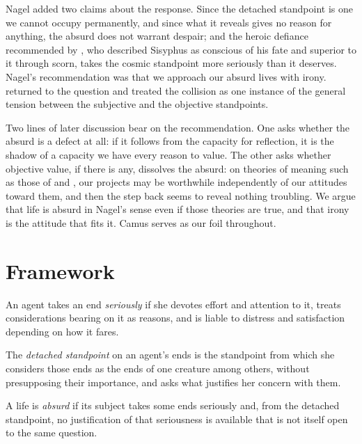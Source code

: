 \documentclass{situationist-preprint}
\begin{document}
Nagel added two claims about the response. Since the detached standpoint is one we cannot occupy permanently, and since what it reveals gives no reason for anything, the absurd does not warrant despair; and the heroic defiance recommended by \citet{Camus1942}, who described Sisyphus as conscious of his fate and superior to it through scorn, takes the cosmic standpoint more seriously than it deserves. Nagel's recommendation was that we approach our absurd lives with irony. \citet[ch.~XI]{Nagel1986} returned to the question and treated the collision as one instance of the general tension between the subjective and the objective standpoints.

Two lines of later discussion bear on the recommendation. One asks whether the absurd is a defect at all: if it follows from the capacity for reflection, it is the shadow of a capacity we have every reason to value. The other asks whether objective value, if there is any, dissolves the absurd: on theories of meaning such as those of \citet{Wolf2010} and \citet{Metz2013}, our projects may be worthwhile independently of our attitudes toward them, and then the step back seems to reveal nothing troubling. We argue that life is absurd in Nagel's sense even if those theories are true, and that irony is the attitude that fits it. Camus serves as our foil throughout.

\section{Framework}

\begin{definition}[Seriousness]\label{d:serious}
An agent takes an end \emph{seriously} if she devotes effort and attention to it, treats considerations bearing on it as reasons, and is liable to distress and satisfaction depending on how it fares.
\end{definition}

\begin{definition}\label{d:detach}
The \emph{detached standpoint} on an agent's ends is the standpoint from which she considers those ends as the ends of one creature among others, without presupposing their importance, and asks what justifies her concern with them.
\end{definition}

\begin{definition}[Absurd]\label{d:absurd}
A life is \emph{absurd} if its subject takes some ends seriously and, from the detached standpoint, no justification of that seriousness is available that is not itself open to the same question.
\end{definition}
\end{document}
